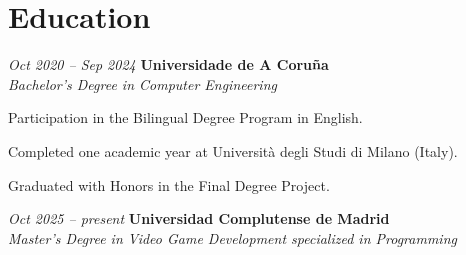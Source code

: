\section{Education}

\begin{twocolentry}{
\textit{Oct 2020 – Sep 2024}}
\textbf{Universidade de A Coruña} \\
\hspace*{2em}\textit{Bachelor’s Degree in Computer Engineering}
\end{twocolentry}

\vspace{0.2 cm}
\begin{onecolentry}
\begin{highlights}
\item Participation in the Bilingual Degree Program in English.
\item Completed one academic year at Università degli Studi di Milano (Italy).
\item Graduated with Honors in the Final Degree Project.
\end{highlights}
\end{onecolentry}

\vspace{0.2 cm}

\begin{twocolentry}{
\textit{Oct 2025 – present}}
\textbf{Universidad Complutense de Madrid} \\
\hspace*{2em}\textit{Master’s Degree in Video Game Development specialized in Programming}
\end{twocolentry}